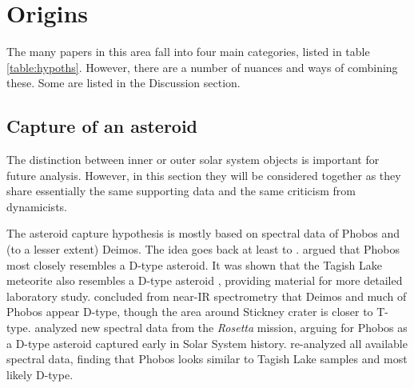 %
%
%
%



\section{Origins}\label{appendix:origins}

The many papers in this area fall into four main categories, listed in table \ref{table:hypoths}. However, there are a number of nuances and ways of combining these. Some are listed in the Discussion section.

\subsection{Capture of an asteroid}

The distinction between inner or outer solar system objects is important for future analysis. However, in this section they will be considered together as they share essentially the same supporting data and the same criticism from dynamicists.

The asteroid capture hypothesis is mostly based on spectral data of Phobos and (to a lesser extent) Deimos. The idea  goes back at least to \citet{hunten_capture_1979}. \citet{murchie_mars_1999} argued that Phobos most closely resembles a D-type asteroid. It was shown that the Tagish Lake meteorite also resembles a D-type asteroid \citep{hiroi_tagish_2001, hiroi_tagish_2003}, providing material for more detailed laboratory study. \citet{rivkin_near-infrared_2002} concluded from near-IR spectrometry that Deimos and much of Phobos appear D-type, though the area around Stickney crater is closer to T-type. \citet{pajola_spectrophotometric_2012} analyzed new spectral data from the \textit{Rosetta} mission, arguing for Phobos as a D-type asteroid captured early in  Solar System history. \citet{pajola_phobos_2013} re-analyzed all available spectral data, finding that Phobos looks similar to Tagish Lake samples and most likely D-type.

